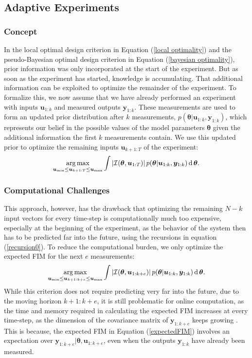 \subsection{Adaptive Experiments}
\subsubsection{Concept}
In the local optimal design criterion in Equation (\ref{local optimality}) and the pseudo-Bayesian optimal design criterion in Equation (\ref{bayesian optimality}), prior information was only incorporated at the start of the experiment. But as soon as the experiment has started, knowledge is accumulating. That additional information can be exploited to optimize the remainder of the experiment. To formalize this, we now assume that we have already performed an experiment with inputs $\bm u_{1:k}$ and measured outputs  $\bm y_{1:k}$. These measurements are used to form an updated prior distribution after $k$ measurements, $p(\bm \theta | \bm u_{1:k}, \bm y_{1:k})$, which represents our belief in the possible values of the model parameters $\bm \theta$ given the additional information the first $k$ measurements contain. We use this updated prior to optimize the remaining inputs $\bm u_{k+1:T}$ of the experiment:
\begin{equation*}
\operatorname*{arg\,max}_{\bm u_\text{min} \leq \bm u_{k+1:T}  \leq \bm u_\text{max}} \int \left | \mathcal{I}(\bm \theta,\bm u_{1:T}) \right | p(\bm \theta |  \bm u_{1:k},\bm y_{1:k}) \operatorname{\mathrm{d}} \bm \theta.
\end{equation*}
\subsubsection{Computational Challenges}
This approach, however, has the drawback that optimizing the remaining $N-k$ input vectors for every time-step is computationally much too expensive, especially at the beginning of the experiment, as the behavior of the system then has to be predicted far into the future, using the recursions in equation (\ref{recursion0}). To reduce the computational burden, we only optimize the expected FIM for the next $e$ measurements:
\begin{equation*}
\operatorname*{arg\,max}_{\bm u_\text{min} \leq \bm u_{k+1:k+e} \leq \bm u_\text{max}} \int \left | \mathcal{I}(\bm \theta,\bm u_{1:k+e}) \right | p(\bm \theta |  \bm u_{1:k}, \bm y_{1:k}) \operatorname{\mathrm{d}} \bm \theta.
\end{equation*}
While this criterion does not require predicting very far into the future, due to the moving horizon $k+1:k+e$, it is still problematic for online computation, as the time and memory required in calculating the expected FIM increases at every time-step, as the dimension of the covariance matrix of $\bm y_{1:k+e}$ keeps growing \parencite{cavanaugh}. This is because, the expected FIM in Equation (\ref{expectedFIM}) involves an expectation over $\bm y_{1:k+e}| \bm \theta, \bm u_{1:k+e}$, even when the outputs $\bm y_{1:k}$ have already been measured.
